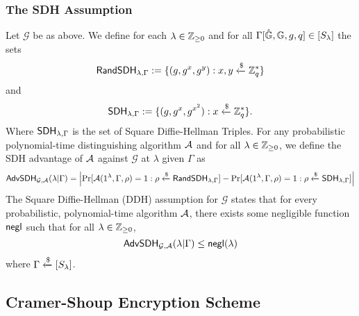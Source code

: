 \subsubsection{The SDH Assumption}

Let $\mathcal{G}$ be as above. We define for each $\lambda\in\mathbb{Z}_{\geq 0}$ and for all $\Gamma[\hat{\mathbb{G}}, \mathbb{G}, g, q]\in[S_\lambda]$ the sets 
\begin{equation*}
	\mathsf{RandSDH}_{\lambda,\Gamma} := \{(g, g^x, g^{y}) : x,y\xleftarrow{\$}\mathbb{Z}_q^{*}\}
\end{equation*}
and
\begin{equation*}
	\mathsf{SDH}_{\lambda,\Gamma} := \{(g, g^x, g^{x^2}) : x\xleftarrow{\$}\mathbb{Z}_q^{*}\}.
\end{equation*}
Where $\mathsf{SDH}_{\lambda,\Gamma}$ is the set of Square Diffie-Hellman Triples. For any probabilistic polynomial-time distinguishing algorithm $\mathcal{A}$ and for all $\lambda\in\mathbb{Z}_{\geq 0}$, we define the SDH advantage of $\mathcal{A}$ against $\mathcal{G}$ at $\lambda$ given $\Gamma$ as
\begin{equation*}
	\mathsf{AdvSDH}_{\mathcal{G},\mathcal{A}}(\lambda | \Gamma) = \left|\Pr[\mathcal{A}(1^\lambda,\Gamma,\rho) = 1 : \rho\xleftarrow{\$}\mathsf{RandSDH}_{\lambda,\Gamma}] - \Pr[\mathcal{A}(1^\lambda,\Gamma,\rho) = 1 : \rho\xleftarrow{\$}\mathsf{SDH}_{\lambda,\Gamma}]\right|
\end{equation*}
The Square Diffie-Hellman (DDH) assumption for $\mathcal{G}$ states that for every probabilistic, polynomial-time algorithm $\mathcal{A}$, there exists some negligible function $\mathsf{negl}$ such that for all $\lambda\in\mathbb{Z}_{\geq 0}$, $$\mathsf{AdvSDH}_{\mathcal{G},\mathcal{A}}(\lambda | \Gamma)\leq\mathsf{negl}(\lambda)$$ where $\Gamma\xleftarrow{\$}[S_\lambda]$.



\subsection{Cramer-Shoup Encryption Scheme}

